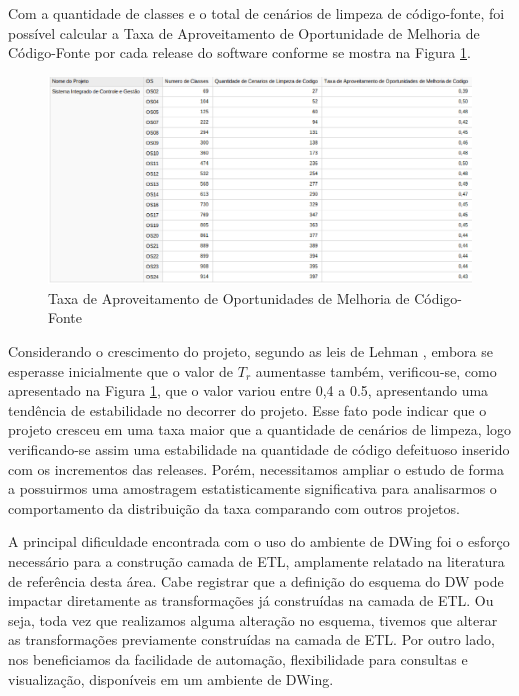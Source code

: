 Com a quantidade de classes e o total de cenários de limpeza de código-fonte, foi possível calcular a Taxa de Aproveitamento de Oportunidade de Melhoria de Código-Fonte por cada release do software conforme se mostra na Figura \ref{fig:taxa-cenarios}.

\begin{figure}[H]
\centering
\includegraphics[keepaspectratio=true,scale=0.38]{figuras/taxa-parcial.eps}
\caption{Taxa de Aproveitamento de Oportunidades de Melhoria de Código-Fonte}
\label{fig:taxa-cenarios}
\end{figure}
\FloatBarrier

Considerando o crescimento do projeto, segundo as leis de Lehman \cite{Lehman1980b}, embora se esperasse inicialmente que o valor de $ T_r $ aumentasse também, verificou-se,  como apresentado na Figura \ref{fig:taxa-cenarios}, que o valor variou entre 0,4 a 0.5, apresentando uma tendência de estabilidade no decorrer do projeto.  Esse fato pode indicar que o projeto cresceu em uma taxa maior que a quantidade de cenários de limpeza, logo verificando-se assim uma estabilidade na quantidade de código defeituoso inserido com os incrementos das releases. Porém, necessitamos ampliar o estudo de forma a possuirmos uma amostragem estatisticamente significativa para analisarmos o comportamento da distribuição da taxa comparando com outros projetos.


A principal dificuldade encontrada com o uso do ambiente de DWing foi o esforço necessário para a construção camada de ETL, amplamente relatado na literatura de referência desta área. Cabe registrar que a definição do esquema do DW pode impactar diretamente as transformações já construídas na camada de ETL. Ou seja, toda vez que realizamos alguma alteração no esquema, tivemos que alterar as transformações previamente construídas na camada de ETL.
Por outro lado, nos beneficiamos da facilidade de automação, flexibilidade para consultas e visualização, disponíveis em um ambiente de DWing.


